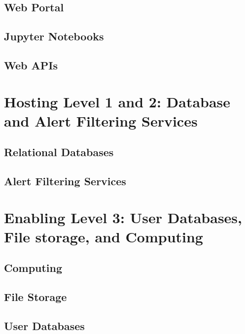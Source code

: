 \documentclass[DM,lsstdraft,toc]{lsstdoc}
\begin{document}
\subsection{Web Portal}

\subsection{Jupyter Notebooks}

\subsection{Web APIs}

\section{Hosting Level 1 and 2: Database and Alert Filtering Services}

\subsection{Relational Databases}

\subsection{Alert Filtering Services}

\section{Enabling Level 3: User Databases, File storage, and Computing}

\subsection{Computing}

\subsection{File Storage}

\subsection{User Databases}
\end{document}
